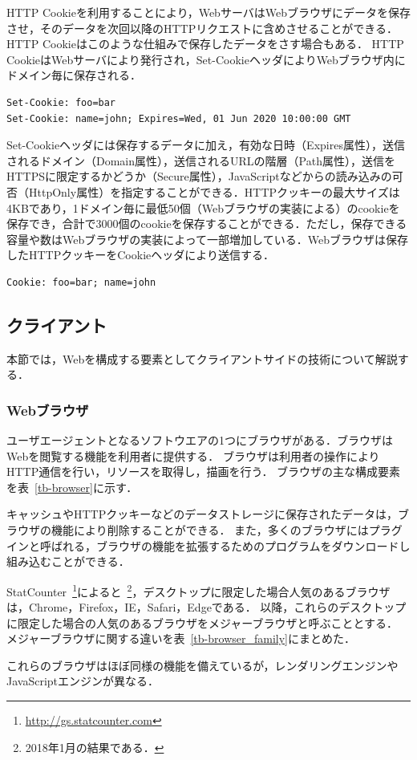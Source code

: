 HTTP Cookieを利用することにより，WebサーバはWebブラウザにデータを保存させ，そのデータを次回以降のHTTPリクエストに含めさせることができる．HTTP Cookieはこのような仕組みで保存したデータをさす場合もある．
HTTP CookieはWebサーバにより発行され，Set-CookieヘッダによりWebブラウザ内にドメイン毎に保存される．
\begin{verbatim}
Set-Cookie: foo=bar
Set-Cookie: name=john; Expires=Wed, 01 Jun 2020 10:00:00 GMT
\end{verbatim}
Set-Cookieヘッダには保存するデータに加え，有効な日時（Expires属性），送信されるドメイン（Domain属性），送信されるURLの階層（Path属性），送信をHTTPSに限定するかどうか（Secure属性），JavaScriptなどからの読み込みの可否（HttpOnly属性）を指定することができる．HTTPクッキーの最大サイズは4KBであり，1ドメイン毎に最低50個（Webブラウザの実装による）のcookieを保存でき，合計で3000個のcookieを保存することができる．ただし，保存できる容量や数はWebブラウザの実装によって一部増加している．Webブラウザは保存したHTTPクッキーをCookieヘッダにより送信する．
\begin{verbatim}
Cookie: foo=bar; name=john
\end{verbatim}
\subsection{クライアント}
本節では，Webを構成する要素としてクライアントサイドの技術について解説する．
\subsubsection{Webブラウザ}
ユーザエージェントとなるソフトウエアの1つにブラウザがある．ブラウザはWebを閲覧する機能を利用者に提供する．
ブラウザは利用者の操作によりHTTP通信を行い，リソースを取得し，描画を行う．
ブラウザの主な構成要素を表~\ref{tb-browser}に示す．

キャッシュやHTTPクッキーなどのデータストレージに保存されたデータは，ブラウザの機能により削除することができる． 
また，多くのブラウザにはプラグインと呼ばれる，ブラウザの機能を拡張するためのプログラムをダウンロードし組み込むことができる．

StatCounter~\footnote{\url{http://gs.statcounter.com}}によると~\footnote{2018年1月の結果である．}，デスクトップに限定した場合人気のあるブラウザは，Chrome，Firefox，IE，Safari，Edgeである．
以降，これらのデスクトップに限定した場合の人気のあるブラウザをメジャーブラウザと呼ぶこととする．
メジャーブラウザに関する違いを表~\ref{tb-browser_family}にまとめた．

これらのブラウザはほぼ同様の機能を備えているが，レンダリングエンジンやJavaScriptエンジンが異なる．
